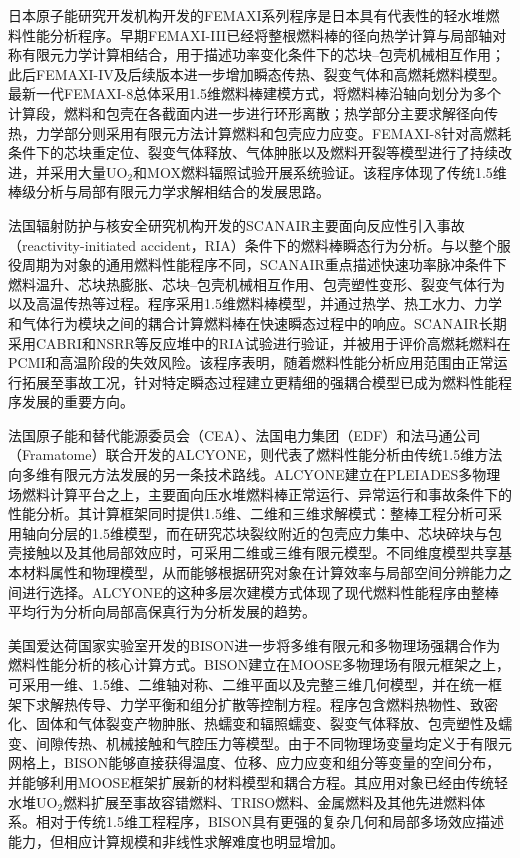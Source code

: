 日本原子能研究开发机构开发的FEMAXI系列程序是日本具有代表性的轻水堆燃料性能分析程序。早期FEMAXI-III已经将整根燃料棒的径向热学计算与局部轴对称有限元力学计算相结合，用于描述功率变化条件下的芯块--包壳机械相互作用；此后FEMAXI-IV及后续版本进一步增加瞬态传热、裂变气体和高燃耗燃料模型。最新一代FEMAXI-8总体采用1.5维燃料棒建模方式，将燃料棒沿轴向划分为多个计算段，燃料和包壳在各截面内进一步进行环形离散；热学部分主要求解径向传热，力学部分则采用有限元方法计算燃料和包壳应力应变\cite{udagawaModelUpdatesFEMAXI2019}。FEMAXI-8针对高燃耗条件下的芯块重定位、裂变气体释放、气体肿胀以及燃料开裂等模型进行了持续改进，并采用大量UO$_2$和MOX燃料辐照试验开展系统验证。该程序体现了传统1.5维棒级分析与局部有限元力学求解相结合的发展思路。

法国辐射防护与核安全研究机构开发的SCANAIR主要面向反应性引入事故（re\-ac\-tiv\-i\-ty-initiated accident，RIA）条件下的燃料棒瞬态行为分析。与以整个服役周期为对象的通用燃料性能程序不同，SCANAIR重点描述快速功率脉冲条件下燃料温升、芯块热膨胀、芯块--包壳机械相互作用、包壳塑性变形、裂变气体行为以及高温传热等过程。程序采用1.5维燃料棒模型，并通过热学、热工水力、力学和气体行为模块之间的耦合计算燃料棒在快速瞬态过程中的响应\cite{moalSCANAIRTransientFuel2014}。SCANAIR长期采用CABRI和NSRR等反应堆中的RIA试验进行验证，并被用于评价高燃耗燃料在PCMI和高温阶段的失效风险。该程序表明，随着燃料性能分析应用范围由正常运行拓展至事故工况，针对特定瞬态过程建立更精细的强耦合模型已成为燃料性能程序发展的重要方向。

法国原子能和替代能源委员会（CEA）、法国电力集团（EDF）和法马通公司（Framatome）联合开发的ALCYONE，则代表了燃料性能分析由传统1.5维方法向多维有限元方法发展的另一条技术路线。ALCYONE建立在PLEIADES多物理场燃料计算平台之上，主要面向压水堆燃料棒正常运行、异常运行和事故条件下的性能分析\cite{introiniALCYONEFuelPerformance2024}。其计算框架同时提供1.5维、二维和三维求解模式：整棒工程分析可采用轴向分层的1.5维模型，而在研究芯块裂纹附近的包壳应力集中、芯块碎块与包壳接触以及其他局部效应时，可采用二维或三维有限元模型。不同维度模型共享基本材料属性和物理模型，从而能够根据研究对象在计算效率与局部空间分辨能力之间进行选择。ALCYONE的这种多层次建模方式体现了现代燃料性能程序由整棒平均行为分析向局部高保真行为分析发展的趋势。

美国爱达荷国家实验室开发的BISON进一步将多维有限元和多物理场强耦合作为燃料性能分析的核心计算方式。BISON建立在MOOSE多物理场有限元框架之上，可采用一维、1.5维、二维轴对称、二维平面以及完整三维几何模型，并在统一框架下求解热传导、力学平衡和组分扩散等控制方程\cite{williamsonBISONFlexibleCode2021}。程序包含燃料热物性、致密化、固体和气体裂变产物肿胀、热蠕变和辐照蠕变、裂变气体释放、包壳塑性及蠕变、间隙传热、机械接触和气腔压力等模型。由于不同物理场变量均定义于有限元网格上，BISON能够直接获得温度、位移、应力应变和组分等变量的空间分布，并能够利用MOOSE框架扩展新的材料模型和耦合方程。其应用对象已经由传统轻水堆UO$_2$燃料扩展至事故容错燃料、TRISO燃料、金属燃料及其他先进燃料体系。相对于传统1.5维工程程序，BISON具有更强的复杂几何和局部多场效应描述能力，但相应计算规模和非线性求解难度也明显增加。


